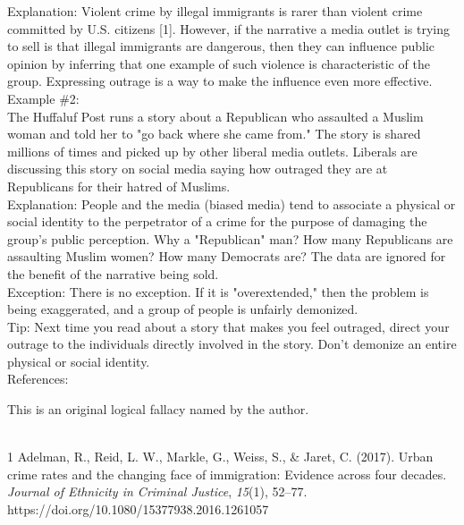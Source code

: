 \documentclass[a4paper,12pt,single,pdftex]{scrartcl}
\begin{document}
    
      Explanation: Violent crime by illegal immigrants is rarer than violent crime committed by U.S. citizens [1]. However, if the narrative a media outlet is trying to sell is that illegal immigrants are dangerous, then they can influence public opinion by inferring that one example of such violence is characteristic of the group. Expressing outrage is a way to make the influence even more effective.
    \\

    
      Example \#2:
    \\

    
      The Huffaluf Post runs a story about a Republican who assaulted a Muslim woman and told her to "go back where she came from." The story is shared millions of times and picked up by other liberal media outlets. Liberals are discussing this story on social media saying how outraged they are at Republicans for their hatred of Muslims.
    \\

    
      Explanation: People and the media (biased media) tend to associate a physical or social identity to the perpetrator of a crime for the purpose of damaging the group's public perception. Why a "Republican" man? How many Republicans are assaulting Muslim women? How many Democrats are? The data are ignored for the benefit of the narrative being sold.
    \\

    
      Exception: There is no exception. If it is "overextended," then the problem is being exaggerated, and a group of people is unfairly demonized.
    \\

    
      Tip: Next time you read about a story that makes you feel outraged, direct your outrage to the individuals directly involved in the story. Don't demonize an entire physical or social identity.
    \\

    References:

    
      This is an original logical fallacy named by the author.

      
        
      \\

      
        1 Adelman, R., Reid, L. W., Markle, G., Weiss, S., \& Jaret, C. (2017). Urban crime rates and the changing face of immigration: Evidence across four decades. {\it Journal of Ethnicity in Criminal Justice}, {\it 15}(1), 52–77. https://doi.org/10.1080/15377938.2016.1261057
      \\
\end{document}
